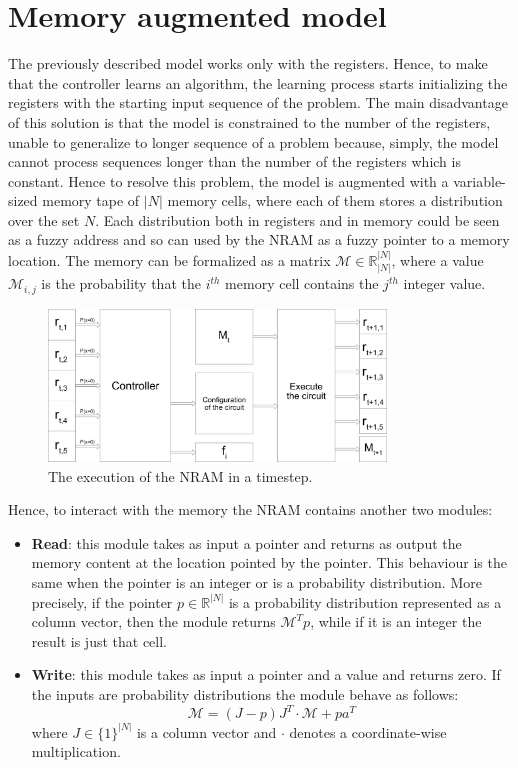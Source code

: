 \section{Memory augmented model}\label{sec:nram-memory}
The previously described model works only with the registers. Hence, to make that the controller learns an algorithm, the learning process starts initializing the registers with the starting input sequence of the problem. The main disadvantage of this solution is that the model is constrained to the number of the registers, unable to generalize to longer sequence of a problem because, simply, the model cannot process sequences longer than the number of the registers which is constant.\newline\newline
Hence to resolve this problem, the model is augmented with a variable-sized memory tape of $|N|$ memory cells, where each of them stores a distribution over the set $N$. Each distribution both in registers and in memory could be seen as a fuzzy address and so can used by the NRAM as a fuzzy pointer to a memory location. The memory can be formalized as a matrix $\mathcal{M} \in \mathbb{R}_{|N|}^{|N|}$, where a value $\mathcal{M}_{i,j}$ is the probability that the $i^{th}$ memory cell contains the $j^{th}$ integer value.\newline\newline
\begin{figure}[t]
	\centering
	\includegraphics[width=0.8\textwidth]{figures/timestep-nram-execution.png}
	\caption{The execution of the NRAM in a timestep.}
	\label{fig:timestep-nram-execution}
\end{figure}
Hence, to interact with the memory the NRAM contains another two modules:
\begin{itemize}
	\item{\textbf{Read}: this module takes as input a pointer and returns as output the memory content at the location pointed by the pointer. This behaviour is the same when the pointer is an integer or is a probability distribution. More precisely, if the pointer $p\in\mathbb{R}^{|N|}$ is a probability distribution represented as a column vector, then the module returns $\mathcal{M}^{T}p$, while if it is an integer the result is just that cell.}
	\item{\textbf{Write}: this module takes as input a pointer and a value and returns zero. If the inputs are probability distributions the module behave as follows:
\begin{equation}
	\mathcal{M} = (J - p)J^{T} \cdot \mathcal{M} + pa^{T}
\end{equation}
where $J \in \{1\}^{|N|}$ is a column vector and $\cdot$ denotes a coordinate-wise multiplication.}
\end{itemize}
